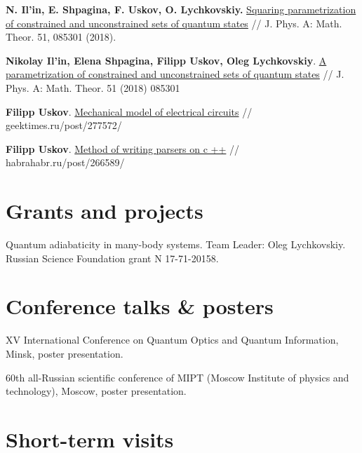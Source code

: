 \documentclass[10pt,a4paper,sans]{moderncv}
\begin{document}
	{\textbf{N. Il'in, E. Shpagina, F. Uskov, O. Lychkovskiy.}
	{\textcolor{blue}{\href{https://doi.org/10.1088/1751-8121/aaa32d}{Squaring parametrization of constrained and unconstrained sets of quantum states}}} //  J. Phys. A: Math. Theor. 51, 085301 (2018).}

	{\textbf{Nikolay Il'in, Elena Shpagina, Filipp Uskov, Oleg Lychkovskiy}.
	{\textcolor{blue}{\href{http://iopscience.iop.org/article/10.1088/1751-8121/aaa32d/meta}{A parametrization of constrained and unconstrained sets of quantum states}}} //  J. Phys. A: Math. Theor. 51 (2018) 085301}

	{\textbf{Filipp Uskov}.
	{\textcolor{blue}{\href{https://habr.com/post/372403/}{Mechanical model of electrical circuits}}} //   geektimes.ru/post/277572/}

	{\textbf{Filipp Uskov}.
	{\textcolor{blue}{\href{https://habr.com/post/266589/}{ Method of writing parsers on c ++}}} //    habrahabr.ru/post/266589/}

\section{Grants and projects}
	{Quantum adiabaticity in many-body systems. Team Leader: Oleg Lychkovskiy. Russian Science Foundation grant N 17-71-20158.}{}{}{}{}
	
\section{Conference talks \& posters}
	{XV International Conference on Quantum Optics and Quantum Information, Minsk, poster presentation.}{}{}{}{}
	
	{60th all-Russian scientific conference of MIPT (Moscow Institute of physics and technology), Moscow, poster presentation.}{}{}{}{}
	

\section{Short-term visits}

\end{document}
